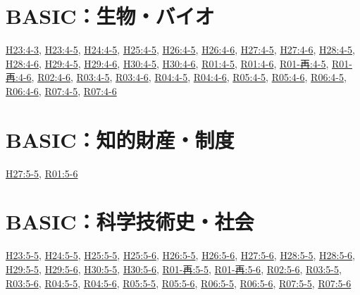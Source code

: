 \section{BASIC：生物・バイオ}
\hyperref[q:h23-reg-basic-4-3]{H23:4-3}, \hyperref[q:h23-reg-basic-4-5]{H23:4-5}, \hyperref[q:h24-reg-basic-4-5]{H24:4-5}, \hyperref[q:h25-reg-basic-4-5]{H25:4-5}, \hyperref[q:h26-reg-basic-4-5]{H26:4-5}, \hyperref[q:h26-reg-basic-4-6]{H26:4-6}, \hyperref[q:h27-reg-basic-4-5]{H27:4-5}, \hyperref[q:h27-reg-basic-4-6]{H27:4-6}, \hyperref[q:h28-reg-basic-4-5]{H28:4-5}, \hyperref[q:h28-reg-basic-4-6]{H28:4-6}, \hyperref[q:h29-reg-basic-4-5]{H29:4-5}, \hyperref[q:h29-reg-basic-4-6]{H29:4-6}, \hyperref[q:h30-reg-basic-4-5]{H30:4-5}, \hyperref[q:h30-reg-basic-4-6]{H30:4-6}, \hyperref[q:r01-reg-basic-4-5]{R01:4-5}, \hyperref[q:r01-reg-basic-4-6]{R01:4-6}, \hyperref[q:r01-ret-basic-4-5]{R01-再:4-5}, \hyperref[q:r01-ret-basic-4-6]{R01-再:4-6}, \hyperref[q:r02-reg-basic-4-6]{R02:4-6}, \hyperref[q:r03-reg-basic-4-5]{R03:4-5}, \hyperref[q:r03-reg-basic-4-6]{R03:4-6}, \hyperref[q:r04-reg-basic-4-5]{R04:4-5}, \hyperref[q:r04-reg-basic-4-6]{R04:4-6}, \hyperref[q:r05-reg-basic-4-5]{R05:4-5}, \hyperref[q:r05-reg-basic-4-6]{R05:4-6}, \hyperref[q:r06-reg-basic-4-5]{R06:4-5}, \hyperref[q:r06-reg-basic-4-6]{R06:4-6}, \hyperref[q:r07-reg-basic-4-5]{R07:4-5}, \hyperref[q:r07-reg-basic-4-6]{R07:4-6}
\section{BASIC：知的財産・制度}
\hyperref[q:h27-reg-basic-5-5]{H27:5-5}, \hyperref[q:r01-reg-basic-5-6]{R01:5-6}
\section{BASIC：科学技術史・社会}
\hyperref[q:h23-reg-basic-5-5]{H23:5-5}, \hyperref[q:h24-reg-basic-5-5]{H24:5-5}, \hyperref[q:h25-reg-basic-5-5]{H25:5-5}, \hyperref[q:h25-reg-basic-5-6]{H25:5-6}, \hyperref[q:h26-reg-basic-5-5]{H26:5-5}, \hyperref[q:h26-reg-basic-5-6]{H26:5-6}, \hyperref[q:h27-reg-basic-5-6]{H27:5-6}, \hyperref[q:h28-reg-basic-5-5]{H28:5-5}, \hyperref[q:h28-reg-basic-5-6]{H28:5-6}, \hyperref[q:h29-reg-basic-5-5]{H29:5-5}, \hyperref[q:h29-reg-basic-5-6]{H29:5-6}, \hyperref[q:h30-reg-basic-5-5]{H30:5-5}, \hyperref[q:h30-reg-basic-5-6]{H30:5-6}, \hyperref[q:r01-ret-basic-5-5]{R01-再:5-5}, \hyperref[q:r01-ret-basic-5-6]{R01-再:5-6}, \hyperref[q:r02-reg-basic-5-6]{R02:5-6}, \hyperref[q:r03-reg-basic-5-5]{R03:5-5}, \hyperref[q:r03-reg-basic-5-6]{R03:5-6}, \hyperref[q:r04-reg-basic-5-5]{R04:5-5}, \hyperref[q:r04-reg-basic-5-6]{R04:5-6}, \hyperref[q:r05-reg-basic-5-5]{R05:5-5}, \hyperref[q:r05-reg-basic-5-6]{R05:5-6}, \hyperref[q:r06-reg-basic-5-5]{R06:5-5}, \hyperref[q:r06-reg-basic-5-6]{R06:5-6}, \hyperref[q:r07-reg-basic-5-5]{R07:5-5}, \hyperref[q:r07-reg-basic-5-6]{R07:5-6}
